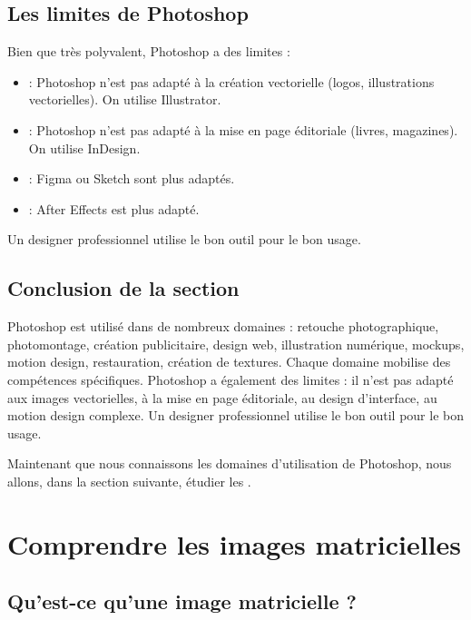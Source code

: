 \subsection{Les limites de Photoshop}

Bien que très polyvalent, Photoshop a des limites :

\begin{itemize}
    \item {} : Photoshop n'est pas adapté à la création vectorielle (logos, illustrations vectorielles). On utilise Illustrator.
    \item {} : Photoshop n'est pas adapté à la mise en page éditoriale (livres, magazines). On utilise InDesign.
    \item {} : Figma ou Sketch sont plus adaptés.
    \item {} : After Effects est plus adapté.
\end{itemize}

Un designer professionnel utilise le bon outil pour le bon usage.

\subsection*{Conclusion de la section}

Photoshop est utilisé dans de nombreux domaines : retouche photographique, photomontage, création publicitaire, design web, illustration numérique, mockups, motion design, restauration, création de textures. Chaque domaine mobilise des compétences spécifiques. Photoshop a également des limites : il n'est pas adapté aux images vectorielles, à la mise en page éditoriale, au design d'interface, au motion design complexe. Un designer professionnel utilise le bon outil pour le bon usage.

Maintenant que nous connaissons les domaines d'utilisation de Photoshop, nous allons, dans la section suivante, étudier les .

\section{Comprendre les images matricielles}

\subsection{Qu'est-ce qu'une image matricielle ?}

